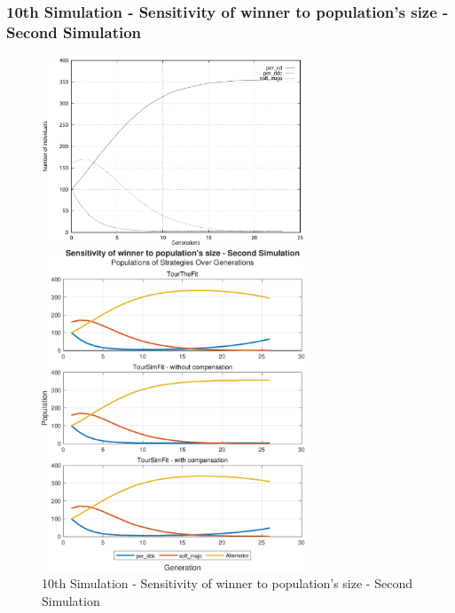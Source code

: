 \documentclass[12pt]{article}
\begin{document}
\subsubsection{10th Simulation - Sensitivity of winner to population's size - Second Simulation}
	\begin{figure}[h]
	    \centering
		\includegraphics[width=0.7\textwidth]{RefPaperFigures/fig8b.jpeg}\par\vspace{0.5em}
	    \includegraphics[width=0.7\textwidth]{Sensitivity of winner to population's size - Second Simulation.pdf}
	    \caption{10th Simulation - Sensitivity of winner to population's size - Second Simulation}
	    \label{fig:Monotonous Convergence}
	\end{figure}
\end{document}
